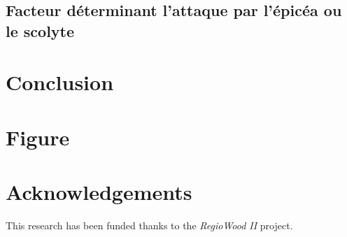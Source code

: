 \documentclass[3p,procedia]{elsarticle}
\begin{document}
	
	

\subsection{Facteur déterminant l'attaque par l'épicéa ou le scolyte}

	

\section{Conclusion}

\section{Figure}


	


\section{Acknowledgements}

This research has been funded thanks to the \textit{RegioWood II} project.

%

\end{document}
